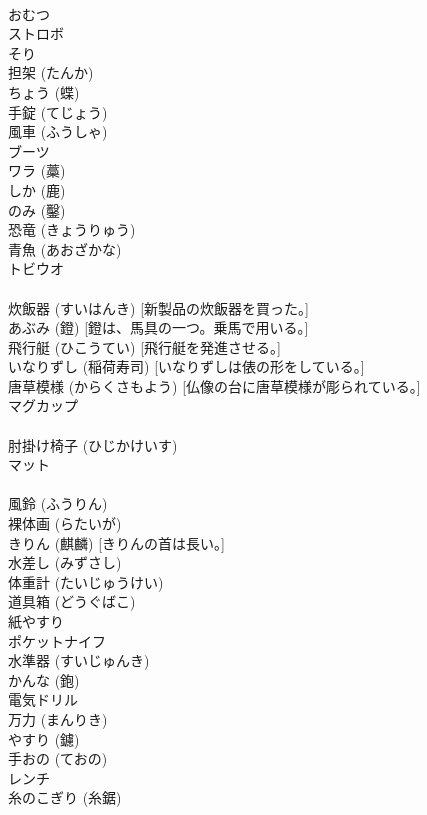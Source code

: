\documentclass[8pt]{extreport}
\begin{document}
\begin{CJK}{UTF8}{min}
\\	おむつ 
\\	ストロボ 
\\	そり 
\\	担架 (たんか) 
\\	ちょう (蝶)
\\	手錠 (てじょう) 
\\	風車 (ふうしゃ) 
\\	ブーツ
\\	ワラ (藁) 
\\	しか (鹿)
\\	のみ (鑿) 
\\	恐竜 (きょうりゅう) 
\\	青魚 (あおざかな) 
\\	トビウオ 
\\	[トビウオのジャンプは沖天の勢いがあった。]
\\	炊飯器 (すいはんき) [新製品の炊飯器を買った。]
\\	あぶみ (鐙) [鐙は、馬具の一つ。乗馬で用いる。]
\\	飛行艇 (ひこうてい) [飛行艇を発進させる。]
\\	いなりずし (稲荷寿司) [いなりずしは俵の形をしている。]
\\	唐草模様 (からくさもよう) [仏像の台に唐草模様が彫られている。]
\\	マグカップ 
\\	[このマグカップは陶製だ。]
\\	肘掛け椅子 (ひじかけいす)
\\	マット 
\\	[玄関にマットを敷く。]
\\	風鈴 (ふうりん) 
\\	裸体画 (らたいが)
\\	きりん (麒麟) [きりんの首は長い。]
\\	水差し (みずさし)
\\	体重計 (たいじゅうけい)
\\	道具箱 (どうぐばこ)
\\	紙やすり
\\	ポケットナイフ
\\	水準器 (すいじゅんき)
\\	かんな (鉋)
\\	電気ドリル
\\	万力 (まんりき)
\\	やすり (鑢) 
\\	手おの (ておの)
\\	レンチ
\\	糸のこぎり (糸鋸) 

\end{CJK}
\end{document}
